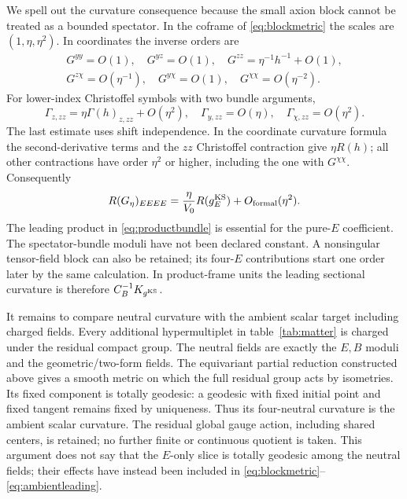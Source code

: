 We spell out the curvature consequence because the small axion
block cannot be treated as a bounded spectator. In the coframe
of \eqref{eq:blockmetric} the scales are $(1,\eta,\eta^2)$.
In coordinates the inverse orders are
\begin{gather*}
 G^{yy}=O(1),\quad G^{yz}=O(1),\quad
 G^{zz}=\eta^{-1}h^{-1}+O(1),\\
 G^{z\chi}=O(\eta^{-1}),\quad G^{y\chi}=O(1),\quad
 G^{\chi\chi}=O(\eta^{-2}).
\end{gather*}
For lower-index Christoffel symbols with two bundle arguments,
\[
 \Gamma_{z,zz}=\eta\Gamma(h)_{z,zz}+O(\eta^2),\quad
 \Gamma_{y,zz}=O(\eta),\quad \Gamma_{\chi,zz}=O(\eta^2).
\]
The last estimate uses shift independence. In the coordinate
curvature formula the second-derivative terms and the $zz$
Christoffel contraction give $\eta R(h)$; all other contractions
have order $\eta^2$ or higher, including the one with
$G^{\chi\chi}$. Consequently
\begin{equation}\label{eq:ambientleading}
 R(G_\eta)_{EEEE}=\frac\eta{V_0}R(g_E^{\rm KS})
                                  +O_{\mathrm{formal}}(\eta^2).
\end{equation}
The leading product in \eqref{eq:productbundle} is essential for
the pure-$E$ coefficient. The spectator-bundle moduli have not
been declared constant. A nonsingular tensor-field block can
also be retained; its four-$E$ contributions start one order
later by the same calculation. In product-frame units the leading
sectional curvature is therefore $C_B^{-1}K_{g^{\mathrm{KS}}}$.

It remains to compare neutral curvature with the ambient scalar
target including charged fields. Every additional hypermultiplet
in table~\ref{tab:matter} is charged under the residual compact
group. The neutral fields are exactly the $E,B$ moduli and the
geometric/two-form fields. The equivariant partial reduction
constructed above gives a smooth metric on which the full residual
group acts by isometries. Its fixed component is totally geodesic:
a geodesic with fixed initial point and fixed tangent remains
fixed by uniqueness. Thus its four-neutral curvature is the
ambient scalar curvature. The residual global gauge action,
including shared centers, is retained; no further finite or
continuous quotient is taken. This argument does not say that
the $E$-only slice is totally geodesic among the neutral fields;
their effects have instead been included in
\eqref{eq:blockmetric}--\eqref{eq:ambientleading}.

